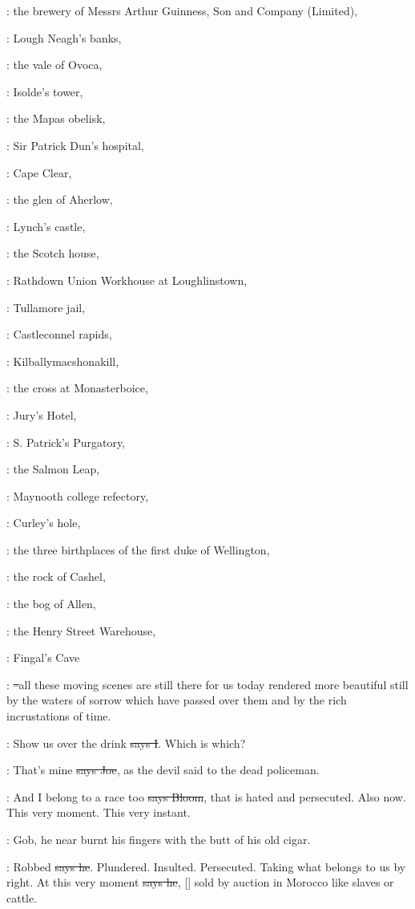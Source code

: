 :
the brewery of Messrs Arthur Guinness, Son and Company (Limited),

:
Lough Neagh's banks,

:
the vale of Ovoca,

:
Isolde's tower,

:
the Mapas obelisk, 

:
Sir Patrick Dun's hospital, 

:
Cape Clear, 

:
the glen of Aherlow, 

:
Lynch's castle, 

:
the Scotch house, 

:
Rathdown Union Workhouse at Loughlinstown, 

:
Tullamore jail, 

:
Castleconnel rapids, 

:
Kilballymacshonakill, 

:
the cross at Monasterboice, 

:
Jury's Hotel, 

:
S. Patrick's Purgatory, 

:
the Salmon Leap, 

:
Maynooth college refectory, 

:
Curley's hole, 

:
the three birthplaces of the first duke of Wellington, 

:
the rock of Cashel, 

:
the bog of Allen, 

:
the Henry Street Warehouse, 

:
Fingal's Cave

:
\sout{--}all these moving scenes are still there for us
today rendered more beautiful still by the waters of sorrow which have
passed over them and by the rich incrustations of time.

:
Show us over the drink \sout{says I}.
Which is which?

\joe:
That's mine \sout{says Joe},
as the devil said to the dead policeman.

\Bloom:
And I belong to a race too \sout{says Bloom},
that is hated and persecuted.
Also now. This very moment. This very instant.

\Nq:
Gob, he near burnt his fingers with the butt of his old cigar.

\Bloom:
Robbed \sout{says he}. Plundered. Insulted.
Persecuted. Taking what belongs
to us by right. At this very moment \sout{says he},
[]
sold by auction in Morocco like slaves or cattle.

